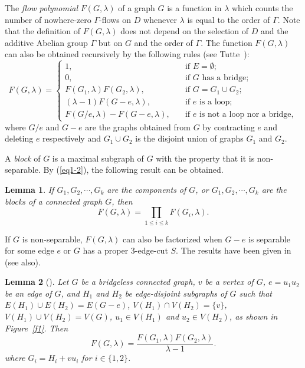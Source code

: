 \documentclass[11pt]{article}
\newtheorem{lem}{Lemma}
\newcommand {\red} {\textcolor{red}}
\newcommand{\beeq}{\begin{equation}}
\newcommand{\eneq}{\end{equation}}
\newcommand {\relabel}[1] {\label{#1} \red{[*: #1]}}\newcommand {\rebibitem}[1] {\bibitem{#1} \red{[*: #1]}}%
\def\relabel {\label} \def\rebibitem {\bibitem}  %
\begin{document}
The {\it flow polynomial} $F(G,\lambda)$ of a graph $G$
is a function in $\lambda$ which counts 
the number of nowhere-zero $\Gamma$-flows on $D$
whenever $\lambda$ is equal to the order of $\Gamma$. 
Note that the definition of $F(G,\lambda)$ 
does not depend on the selection of 
$D$ and the additive Abelian group $\Gamma$ but on $G$ and 
the order of $\Gamma$. 
The function $F(G,\lambda)$ 
can also be obtained recursively by the following  rules
(see Tutte~\cite{tut}):
\begin{equation}\relabel{eq1-2}
F(G,\lambda)=
\left \{
\begin{array}{ll}
1, &\mbox{if }E=\emptyset;\\
0, &\mbox{if }G\mbox{ has a bridge};\\
F(G_1,\lambda)F(G_2,\lambda),
&\mbox{if }G=G_1\cup G_2;\\
(\lambda-1)F(G-e,\lambda), &\mbox{if }e\mbox{ is a loop};\\
F(G / e,\lambda)-F(G-e,\lambda),  \quad
&\mbox{if }e\mbox{ is not a loop nor a bridge},
\end{array}
\right.
\end{equation}
where $G/e$ and $G-e$
are the graphs obtained from 
$G$ by contracting $e$ and deleting $e$ respectively
and $G_1\cup G_2$ is the disjoint union of graphs 
$G_1$ and $G_2$.


A {\it block} of $G$ is 
a maximal subgraph of $G$ 
with the property that it is non-separable.
By (\ref{eq1-2}), the following result can be obtained.

\begin{lem}
\relabel{block-factor} 
If $G_1, G_2, \cdots, G_k$ are the components of $G$,
or $G_1, G_2, \cdots, G_k$ are the blocks of 
a connected graph $G$, then 
\beeq
F(G,\lambda)=\prod_{1\le i\le k}F(G_i,\lambda).
\eneq
\end{lem}


If $G$ is non-separable, $F(G,\lambda)$ can also be factorized 
when $G-e$ is separable for some edge $e$ 
or $G$ has a proper $3$-edge-cut $S$.
The results have been given in 
~\cite{jac3} (see \cite{dong2, jac2,jac4} also). 




\begin{lem}[\cite{jac3}]
\relabel{v-edge}
Let $G$ be a bridgeless connected graph, $v$ be a vertex of $G$, 
$e = u_1u_2$ be an edge of $G$, and 
$H_1$ and $H_2$ be edge-disjoint subgraphs of 
$G$ such that $E(H_1) \cup E(H_2) = E(G - e)$, 
$V(H_1)\cap V(H_2) = \{v\}$, 
$V(H_1)\cup V(H_2) =V(G)$,
$u_1\in V (H_1)$ and $u_2\in V(H_2)$, as shown 
in Figure~\ref{f1}. 
Then 
\beeq
F(G, \lambda) =
\frac{F(G_1, \lambda)F(G_2, \lambda)}{\lambda -1}.
\eneq
where $G_i=H_i+vu_i$  for $i\in \{1, 2\}$.
\end{lem}
\end{document}
